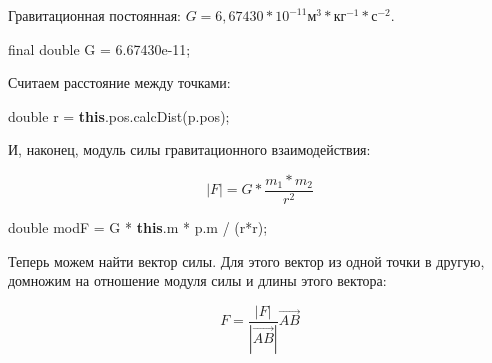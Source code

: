 \documentclass[
  12pt,
  a4paper,
]{article}
\newenvironment{Shaded}{}{}
\newcommand{\DataTypeTok}[1]{\textcolor[rgb]{0.56,0.13,0.00}{#1}}
\newcommand{\FloatTok}[1]{\textcolor[rgb]{0.25,0.63,0.44}{#1}}
\newcommand{\FunctionTok}[1]{\textcolor[rgb]{0.02,0.16,0.49}{#1}}
\newcommand{\KeywordTok}[1]{\textcolor[rgb]{0.00,0.44,0.13}{\textbf{#1}}}
\newcommand{\NormalTok}[1]{#1}
\newcommand{\OperatorTok}[1]{\textcolor[rgb]{0.40,0.40,0.40}{#1}}
\begin{document}
Гравитационная постоянная:
\(G = 6,67430*10^{-11} \text{м}^{3}*\text{кг}^{-1}*\text{с}^{-2}\).

\begin{Shaded}
\begin{Highlighting}[]
\DataTypeTok{final} \DataTypeTok{double}\NormalTok{ G }\OperatorTok{=} \FloatTok{6.67430e{-}11}\OperatorTok{;}
\end{Highlighting}
\end{Shaded}

Считаем расстояние между точками:

\begin{Shaded}
\begin{Highlighting}[]
\DataTypeTok{double}\NormalTok{ r }\OperatorTok{=} \KeywordTok{this}\OperatorTok{.}\FunctionTok{pos}\OperatorTok{.}\FunctionTok{calcDist}\OperatorTok{(}\NormalTok{p}\OperatorTok{.}\FunctionTok{pos}\OperatorTok{);}
\end{Highlighting}
\end{Shaded}

И, наконец, модуль силы гравитационного взаимодействия:

\begin{equation*}
|F| = G*\frac{m_{1} * m_{2}}{r^{2}}
\end{equation*}

\begin{Shaded}
\begin{Highlighting}[]
\DataTypeTok{double}\NormalTok{ modF }\OperatorTok{=}\NormalTok{ G }\OperatorTok{*} \KeywordTok{this}\OperatorTok{.}\FunctionTok{m} \OperatorTok{*}\NormalTok{ p}\OperatorTok{.}\FunctionTok{m} \OperatorTok{/} \OperatorTok{(}\NormalTok{r}\OperatorTok{*}\NormalTok{r}\OperatorTok{);}
\end{Highlighting}
\end{Shaded}

Теперь можем найти вектор силы. Для этого вектор из одной точки в
другую, домножим на отношение модуля силы и длины этого вектора:

\begin{equation*}
F = \frac{|F|}{|\vec{AB}|}\vec{AB}
\end{equation*}
\end{document}
